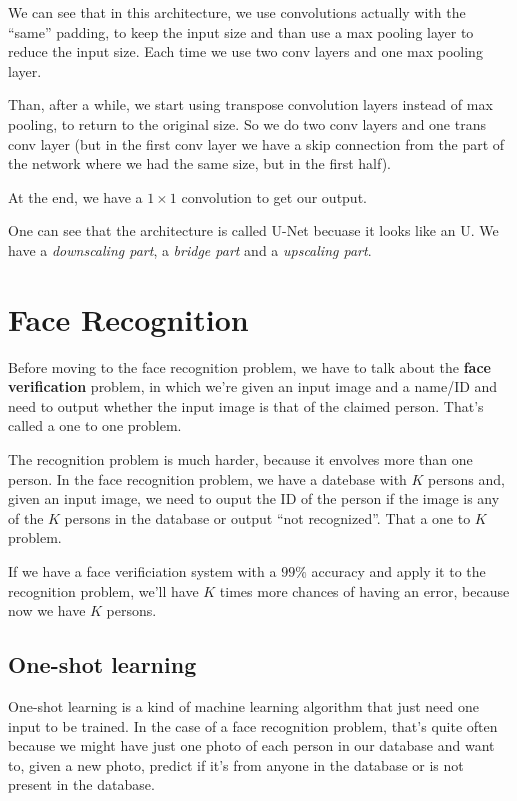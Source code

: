 \documentclass[12pt, a4paper, oneside]{book}
\begin{document}
We can see that in this architecture, we use convolutions actually with the
``same'' padding, to keep the input size and than use a max pooling layer to
reduce the input size. Each time we use two conv layers and one max pooling
layer.

Than, after a while, we start using transpose convolution layers instead of max
pooling, to return to the original size. So we do two conv layers and one trans
conv layer (but in the first conv layer we have a skip connection from the part
of the network where we had the same size, but in the first half).

At the end, we have a $1\times 1$ convolution to get our output.

One can see that the architecture is called U-Net becuase it looks like an U. We
have a \textit{downscaling part}, a \textit{bridge part} and a \textit{upscaling
part}.

\section{Face Recognition}%
\label{sec:face_recognition}

Before moving to the face recognition problem, we have to talk about the
\textbf{face verification} problem, in which we're given an input image and a
name/ID and need to output whether the input image is that of the claimed
person. That's called a one to one problem.

The recognition problem is much harder, because it envolves more than one
person. In the face recognition problem, we have a datebase with $K$ persons
and, given an input image, we need to ouput the ID of the person if the image is
any of the $K$ persons in the database or output ``not recognized''. That a one
to $K$ problem.

If we have a face verificiation system with a $99\%$ accuracy and apply it to
the recognition problem, we'll have $K$ times more chances of having an error,
because now we have $K$ persons.

\subsection{One-shot learning}%
\label{sub:one_shot_learning}

One-shot learning is a kind of machine learning algorithm that just need one
input to be trained. In the case of a face recognition problem, that's quite
often because we might have just one photo of each person in our database and
want to, given a new photo, predict if it's from anyone in the database or is
not present in the database.
\end{document}
